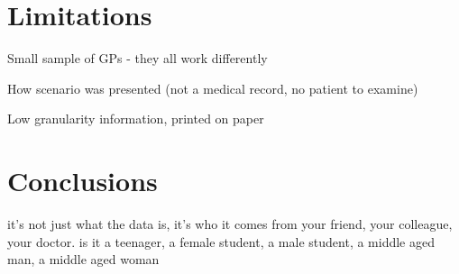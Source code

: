 \documentclass{sigchi}
\begin{document}




\section{Limitations}

Small sample of GPs - they all work differently

How scenario was presented (not a medical record, no patient to examine)

Low granularity information, printed on paper



\section{Conclusions}



it's not just what the data is, it's who it comes from {your friend, your colleague, your doctor}. is it {a teenager, a female student, a male student, a middle aged man, a middle aged woman}




\end{document}
